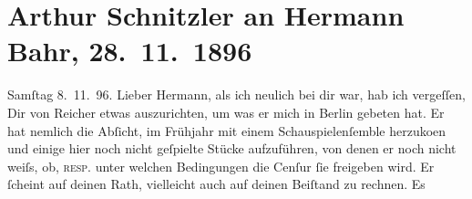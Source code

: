

         
         \renewcommand{\erwaehntePersonen}{Personen: Hermann Bahr, Max Halbe, Gerhart Hauptmann, Emanuel Reicher}
         \renewcommand{\erwaehnteOrte}{Orte: Berlin, Wien, Österreich}
         \renewcommand{\erwaehnteWerke}{Werke: Die Weber. Schauspiel aus den vierziger Jahren, Jugend. Ein Liebesdrama}
               \section[Arthur Schnitzler an Hermann Bahr, 28. 11. 1896]{ Arthur Schnitzler an Hermann Bahr, 28. 11. 1896}\nopagebreak{}\rehead{ }\begin{ledgroupsized}[t]{13cm}\normalsize\beginnumbering \toendnotes[C]{\smallbreak\pagebreak[2]} 
\toendnotes[C]{\smallbreak}\pstart
           \raggedleft{}{\pb}Samſtag 8. 11. 96.\pend
           \pstart{}Lieber Hermann,\pend\pstart
           als ich neulich bei dir war, hab ich vergeſſen, Dir von Reicher etwas auszurichten, um was er mich in Berlin gebeten hat. Er hat nemlich die {\pb}Abſicht, im Frühjahr
               mit einem Schauspielenſemble herzuko{\geminationm}en und einige hier
               noch nicht geſpielte Stücke aufzuführen, von denen er noch nicht weiſs, ob, \textsc{resp}. unter welchen Bedingungen die {\pb}Cenſur ſie freigeben
               wird. Er ſcheint auf deinen Rath, vielleicht auch auf deinen Beiſtand zu rechnen. Es

\end{ledgroupsized}

